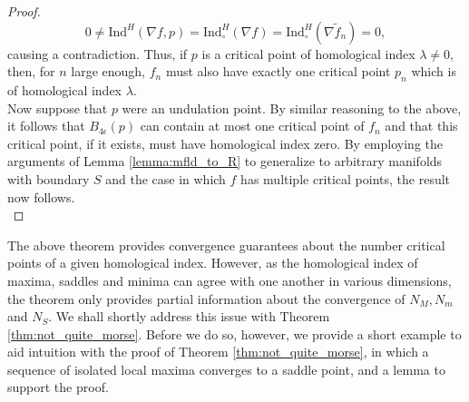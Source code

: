 \documentclass[11pt]{article}
\newcommand{\1}{\mathbf{1}}
\theoremstyle{definition}
\theoremstyle{remark}
\begin{document}
\begin{proof}
\begin{equation}
    0\neq \text{Ind}^H(\nabla f, p) = \text{Ind}^H_\circ(\nabla f)=\text{Ind}^H_\circ(\nabla \tilde{f}_n) = 0,
\end{equation}
causing a contradiction. Thus, if $p$ is a critical point of homological index $\lambda\neq 0$, then, for $n$ large enough, $f_n$ must also have exactly one critical point $p_n$ which is of homological index $\lambda$. \\
\indent Now suppose that $p$ were an undulation point. By similar reasoning to the above, it follows that $B_{4\epsilon}(p)$ can contain at most one critical point of $f_n$ and that this critical point, if it exists, must have homological index zero. By employing the arguments of Lemma \ref{lemma:mfld_to_R} to generalize to arbitrary manifolds with boundary $S$ and the case in which $f$ has multiple critical points, the result now follows.\\
\end{proof}

The above theorem provides convergence guarantees about the number critical points of a given homological index. However, as the homological index of maxima, saddles and minima can agree with one another in various dimensions, the theorem only provides partial information about the convergence of $N_M, N_m$ and $N_S$. We shall shortly address this issue with Theorem \ref{thm:not_quite_morse}. Before we do so, however, we provide a short example to aid intuition with the proof of Theorem \ref{thm:not_quite_morse}, in which a sequence of isolated local maxima converges to a saddle point, and a lemma to support the proof.
\end{document}
